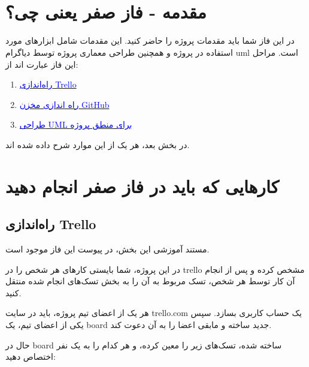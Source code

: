 \documentclass[]{article}
\begin{document}
\KashidaOff


 \Large \textbf{\\\\
}






\section* {{\titr مقدمه - فاز صفر یعنی چی؟}}

در این فاز شما باید مقدمات پروژه را حاضر کنید. این مقدمات شامل ابزارهای مورد استفاده در پروژه و همچنین طراحی معماری پروژه توسط دیاگرام uml است. مراحل این فاز عبارت اند از:

\begin{enumerate}
\item
\hyperref[subsec:trello]{\textcolor{blue}{راه‌اندازی Trello}}

\item
\hyperref[subsec:github]{\textcolor{blue}{راه اندازی مخزن GitHub}}

\item
\hyperref[subsec:uml]{\textcolor{blue}{طراحی UML برای منطق پروژه}}


\end{enumerate}

در بخش بعد، هر یک از این موارد شرح داده شده اند.

\newpage
\section*{{\titr کارهایی که باید در فاز صفر انجام دهید}}


\subsection*{{\titr راه‌اندازی Trello}}

\label{subsec:trello}

مستند آموزشی این بخش، در پیوست این فاز موجود است.

در این پروژه، شما بایستی کارهای هر شخص را در  trello مشخص کرده و پس از انجام آن کار توسط هر شخص، تسک مربوط به آن را  به بخش تسک‌های انجام شده منتقل کنید.

هر یک از اعضای تیم پروژه، باید در سایت trello.com یک حساب کاربری بسازد. سپس یکی از اعضای تیم، یک board جدید ساخته و مابقی اعضا را به آن دعوت کند.

حال در board ساخته شده، تسک‌های زیر را معین کرده، و هر کدام را به یک نفر اختصاص دهید:
\end{document}
